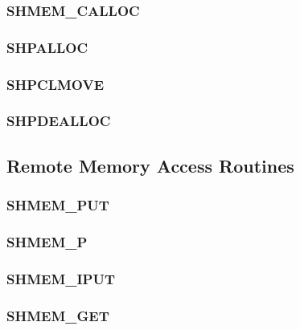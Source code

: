 \documentclass[10pt]{book}
\begin{document}
\subsubsection{\textbf{SHMEM\_CALLOC}}\label{subsec:shmem_calloc}


\subsubsection{\textbf{SHPALLOC}}\label{subsec:shpalloc}


\subsubsection{\textbf{SHPCLMOVE}}\label{subsec:shpclmove}


\subsubsection{\textbf{SHPDEALLOC}}\label{subsec:shpdealloc}


\subsection{Remote Memory Access Routines}\label{sec:rma}


\subsubsection{\textbf{SHMEM\_PUT}}\label{subsec:shmem_put}


\subsubsection{\textbf{SHMEM\_P}}\label{subsec:shmem_p}


\subsubsection{\textbf{SHMEM\_IPUT}}\label{subsec:shmem_iput}


\subsubsection{\textbf{SHMEM\_GET}}\label{subsec:shmem_get}

\end{document}
